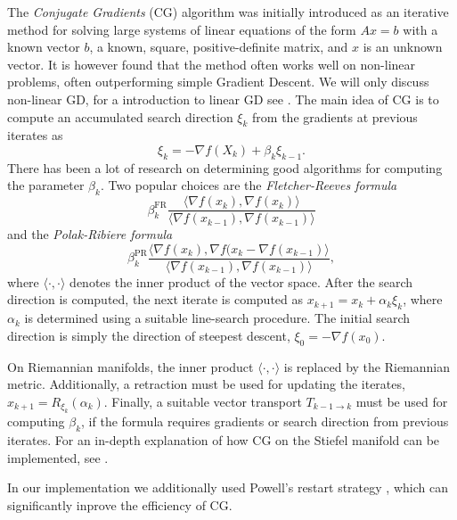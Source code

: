 The \textit{Conjugate Gradients} (CG) algorithm \cite{cite:introduction_to_CG_without_pain, cite:a_survey_of_nonlinear_CG_methods, cite:algorithm_CG_DESCENT_a_CG_method_with_guaranteed_descent} was initially introduced as an iterative method for solving large systems of linear equations of the form $Ax = b$ with a known vector $b$, a known, square, positive-definite matrix, and $x$ is an unknown vector. It is however found that the method often works well on non-linear problems, often outperforming simple Gradient Descent. We will only discuss non-linear GD, for a introduction to linear GD see \cite{cite:introduction_to_CG_without_pain}. The main idea of CG is to compute an accumulated search direction $\xi_{k}$ from the gradients at previous iterates as
\begin{equation}
	\xi_k = -\nabla f(X_{k}) + \beta_{k} \xi_{k-1}.
\end{equation}
There has been a lot of research on determining good algorithms for computing the parameter $\beta_{k}$. Two popular choices are the \textit{Fletcher-Reeves formula} \cite{cite:optimization_on_matrix_manifolds}
\begin{equation}
	\beta_{k}^\text{FR}\frac{\langle\nabla f(x_{k}), \nabla f(x_{k})\rangle}{\langle\nabla f(x_{k-1}), \nabla f(x_{k-1})\rangle}
\end{equation}
and the \textit{Polak-Ribiere formula} \cite{cite:optimization_on_matrix_manifolds}
\begin{equation}
	\beta_{k}^\text{PR}\frac{\langle\nabla f(x_{k}), \nabla f(x_{k}-\nabla f(x_{k-1})\rangle}{\langle\nabla f(x_{k-1}), \nabla f(x_{k-1})\rangle},
\end{equation}
where $\langle\cdot,\cdot\rangle$ denotes the inner product of the vector space. After the search direction is computed, the next iterate is computed as $x_{k+1} = x_k + \alpha_k \xi_k$, where $\alpha_k$ is determined using a suitable line-search procedure. The initial search direction is simply the direction of steepest descent, $\xi_0 = -\nabla f(x_0)$. \par
On Riemannian manifolds, the inner product $\langle\cdot,\cdot\rangle$ is replaced by the Riemannian metric. Additionally, a retraction must be used for updating the iterates, $x_{k+1} = R_{\xi_k}(\alpha_k)$. Finally, a suitable vector transport $T_{k-1\rightarrow k}$ must be used for computing $\beta_k$, if the formula requires gradients or search direction from previous iterates. For an in-depth explanation of how CG on the Stiefel manifold can be implemented, see \cite{cite:optimization_on_matrix_manifolds, cite:a_riemannian_CG_method_for_optimization_on_the_Stifel_manifold, cite:riemannian_optimization_isometric_tensor_networks}. \par
In our implementation we additionally used Powell's restart strategy \cite{cite:on_the_use_of_powells_restart_strategy, cite:a_survey_of_nonlinear_CG_methods, cite:pymanopt}, which can significantly inprove the efficiency of CG.